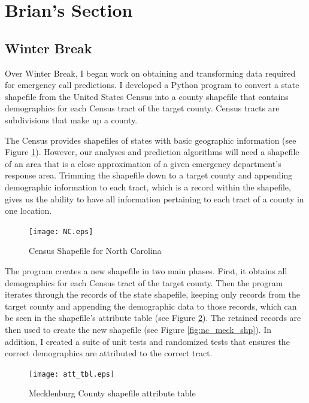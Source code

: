 \documentclass[onecolumn, draftclsnofoot,10pt, compsoc]{IEEEtran}
\begin{document}
\section{Brian's Section} \label{brian_weekly_summ}
\begin{singlespace}
\subsection{Winter Break}
Over Winter Break, I began work on obtaining and transforming data required for emergency call predictions. I developed a Python program to convert a state shapefile from the United States Census into a county shapefile that contains demographics for each Census tract of the target county. Census tracts are subdivisions that make up a county. 

The Census provides shapefiles of states with basic geographic information (see Figure \ref{fig:nc_shp}).  However, our analyses and prediction algorithms will need a shapefile of an area that is a close approximation of a given emergency department's response area. Trimming the shapefile down to a target county and appending demographic information to each tract, which is a record within the shapefile, gives us the ability to have all information pertaining to each tract of a county in one location.

\begin{figure}[h!]
    \centering
    \texttt{[image: NC.eps]}
    \caption{Census Shapefile for North Carolina}
    \label{fig:nc_shp}
\end{figure}

The program creates a new shapefile in two main phases. First, it obtains all demographics for each Census tract of the target county. Then the program iterates through the records of the state shapefile, keeping only records from the target county and appending the demographic data to those records, which can be seen in the shapefile's attribute table (see Figure \ref{fig:att_tbl}). The retained records are then used to create the new shapefile (see Figure \ref{fig:nc_meck_shp}). In addition, I created a suite of unit tests and randomized tests that ensures the correct demographics are attributed to the correct tract.

\begin{figure}[h!]
    \centering
    \texttt{[image: att\_tbl.eps]}
    \caption{Mecklenburg County shapefile attribute table}
    \label{fig:att_tbl}
\end{figure}



\end{singlespace}
\end{document}

